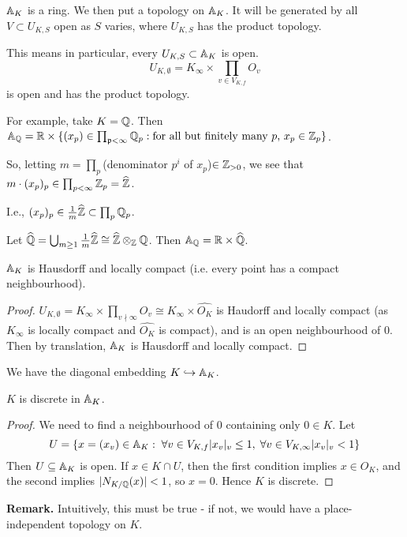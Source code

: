 \documentclass[10pt,a4paper]{article}
\begin{document}
$\mathbb{A}_K$ is a ring. We then put a topology on $\mathbb{A}_K$. It will be generated by all $V \subset U_{K,S}$ open as $S$ varies, where $U_{K,S}$ has the product topology.

This means in particular, every $U_{K,S} \subset \mathbb{A}_K$ is open.
\[U_{K, \emptyset} = K_\infty \times \prod_{v \in V_{K,f}}O_v\]
is open and has the product topology.

For example, take $K=\mathbb{Q}$. Then $\mathbb{A}_{\mathbb{Q}} = \mathbb{R} \times \{(x_p) \in \prod_{\mathfrak{p} < \infty}\mathbb{Q}_p:\text{for all but finitely many $p$, $x_p \in \mathbb{Z}_p$}\}$.

So, letting $m = \prod_p$(denominator $p^i$ of $x_p$)$\in \mathbb{Z}_{>0}$, we see that $m\cdot (x_p)_p \in \prod_{p <\infty} \mathbb{Z}_p = \widehat{\mathbb{Z}}$.

I.e., $(x_p)_p \in \frac{1}{m}\widehat{\mathbb{Z}} \subset \prod_p \mathbb{Q}_p$.

Let $\widehat{\mathbb{Q}} = \bigcup_{m\geq 1}\frac{1}{m}\widehat{\mathbb{Z}} \cong \widehat{\mathbb{Z}}\otimes_{\mathbb{Z}} \mathbb{Q}$. Then $\mathbb{A}_{\mathbb{Q}} = \mathbb{R} \times \widehat{\mathbb{Q}}$.
\begin{proposition}
  $\mathbb{A}_K$ is Hausdorff and locally compact (i.e. every point has a compact neighbourhood).
\end{proposition}
\begin{proof}
  $U_{K, \emptyset} = K_\infty \times \prod_{v\nmid\infty}O_v \cong K_\infty \times \hat{O_K}$ is Haudorff and locally compact (as $K_\infty$ is locally compact and $\hat{O_K}$ is compact), and is an open neighbourhood of 0. Then by translation, $\mathbb{A}_K$ is Hausdorff and locally compact.
\end{proof}
We have the diagonal embedding $K \hookrightarrow \mathbb{A}_K$.
\begin{proposition}
  $K$ is discrete in $\mathbb{A}_K$.
\end{proposition}
\begin{proof}
  We need to find a neighbourhood of $0$ containing only $0 \in K$. Let
  \[U = \{x = (x_v) \in \A_K : \forall v \in V_{K,f} |x_v|_v\leq 1, \forall v \in V_{K, \infty} |x_v|_v <1\}\]
  Then $U \subseteq \mathbb{A}_K$ is open. If $x \in K \cap U$, then the first condition implies $x \in O_K$, and the second implies $|N_{K/\mathbb{Q}}(x)| < 1$, so $x=0$. Hence $K$ is discrete.
\end{proof}
\textbf{Remark.} Intuitively, this must be true - if not, we would have a place-independent topology on $K$.
\end{document}
